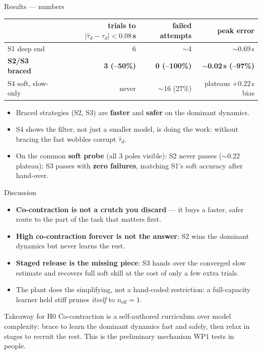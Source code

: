 \documentclass[aspectratio=169, 11pt]{beamer}
\begin{document}
\begin{frame}{Results --- numbers}
\begin{center}
\small
\begin{tabular}{@{}lrrr@{}}
\toprule
 & trials to $|\hat\tau_d-\tau_d|<0.08$\,s & failed attempts & peak error \\
\midrule
S1 deep end          & 6 & $\sim$4 & $\sim$0.69\,s \\
\textbf{S2/S3 braced} & \textcolor{passgreen}{\textbf{3 (--50\%)}}
                      & \textcolor{passgreen}{\textbf{0 (--100\%)}}
                      & \textcolor{passgreen}{\textbf{$\sim$0.02\,s (--97\%)}} \\
S4 soft, slow-only    & \textcolor{failred}{never} & $\sim$16 (27\%) & plateaus $+0.22$\,s bias \\
\bottomrule
\end{tabular}
\end{center}
\vspace{8pt}
\begin{itemize}
  \item Braced strategies (S2, S3) are \textbf{faster} and \textbf{safer}
        on the dominant dynamics.
  \item S4 shows the filter, not just a smaller model, is doing the work:
        without bracing the fast wobbles corrupt $\hat\tau_d$.
  \item On the common \textbf{soft probe} (all 3 poles visible): S2 never
        passes ($\sim$0.22 plateau); S3 passes with \textbf{zero
        failures}, matching S1's soft accuracy after hand-over.
\end{itemize}
\end{frame}

\begin{frame}{Discussion}
\begin{itemize}
  \item \textbf{Co-contraction is not a crutch you discard} --- it buys a
        faster, safer route to the part of the task that matters first.
  \item \textbf{High co-contraction forever is not the answer}: S2 wins
        the dominant dynamics but never learns the rest.
  \item \textbf{Staged release is the missing piece}: S3 hands over the
        converged slow estimate and recovers full soft skill at the cost
        of only a few extra trials.
  \item The plant does the simplifying, not a hand-coded restriction:
        a full-capacity learner held stiff prunes \emph{itself} to
        $n_{\mathrm{eff}}=1$.
\end{itemize}
\vspace{10pt}
\begin{alertblock}{Takeaway for H0}
Co-contraction is a self-authored curriculum over model complexity:
brace to learn the dominant dynamics fast and safely, then relax in
stages to recruit the rest. This is the preliminary mechanism WP1
tests in people.
\end{alertblock}
\end{frame}
\end{document}
